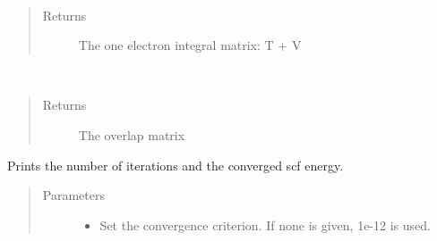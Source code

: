 \documentclass[letterpaper,10pt,english]{sphinxmanual}
\begin{document}
\begin{fulllineitems}
\begin{fulllineitems}
\begin{quote}
\begin{description}
\end{description}\end{quote}

\end{fulllineitems}


\begin{fulllineitems}
\label{\detokenize{RHF:ghf.RHF.RHF.get_one_e}}~\begin{quote}\begin{description}
\item[{Returns}] \leavevmode
The one electron integral matrix: T + V

\end{description}\end{quote}

\end{fulllineitems}


\begin{fulllineitems}
\label{\detokenize{RHF:ghf.RHF.RHF.get_ovlp}}~\begin{quote}\begin{description}
\item[{Returns}] \leavevmode
The overlap matrix

\end{description}\end{quote}

\end{fulllineitems}


\begin{fulllineitems}
\label{\detokenize{RHF:ghf.RHF.RHF.get_scf_solution}}
Prints the number of iterations and the converged scf energy.
\begin{quote}\begin{description}
\item[{Parameters}] \leavevmode\begin{itemize}
\item {} 
 \textendash{} Set the convergence criterion. If none is given, 1e-12 is used.


\end{itemize}
\end{description}
\end{quote}
\end{fulllineitems}
\end{fulllineitems}
\end{document}
